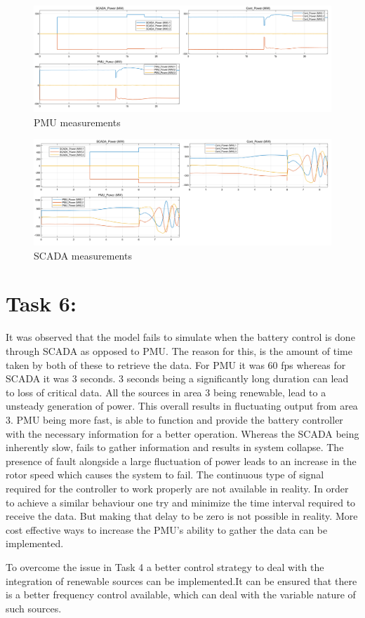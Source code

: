 \begin{figure}[H]
    \centering
        \includegraphics[width=0.8 \linewidth]{images_a4/T5_PMU.png}
        \caption{PMU measurements}
        \label{fig:PMU}   
\end{figure}
\begin{figure}[H]
    \centering
        \includegraphics[width=0.8 \linewidth]{images_a4/T5_SCADA.png}
        \caption{SCADA  measurements}
        \label{fig:SCADA}   
\end{figure}

\section*{\textbf{Task 6}:}

It was observed that the model fails to simulate when the battery control is done through SCADA as opposed to PMU. The reason for this, is the amount of time taken by both of these to retrieve the data. For PMU it was 60 fps whereas for SCADA it was 3 seconds. 3 seconds being a significantly long duration can lead to loss of critical data.
All the sources in area 3 being renewable, lead to a unsteady generation of power. This overall results in fluctuating output from area 3. PMU being more fast, is able to function and provide the battery controller with the necessary information for a better operation. Whereas the SCADA being inherently slow, fails to gather information and results in system collapse. The presence of fault alongside a large fluctuation of power leads to an increase in the rotor speed which causes the system to fail.
The continuous type of signal required for the controller to work properly are not available in reality. In order to achieve a similar behaviour one try and minimize the time interval required to receive the data. But making that delay to be zero is not possible in reality.
More cost effective ways to increase the PMU's ability to gather the data can be implemented.

To overcome the issue in Task 4 a better control strategy to deal with the integration of renewable sources can be implemented.It can be ensured that there is a better frequency control available, which can deal with the variable nature of such sources. 

